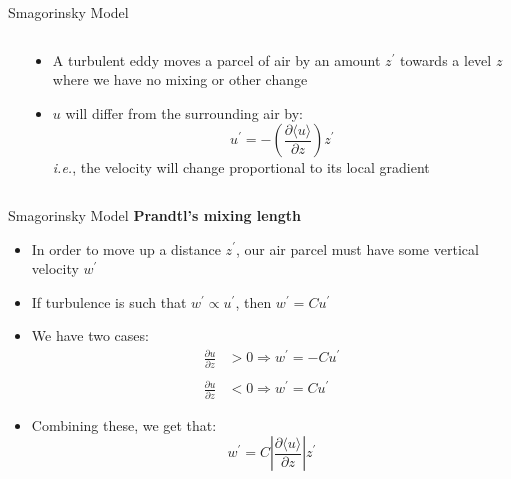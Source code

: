 \begin{frame}{Smagorinsky Model}
\begin{columns}[T]
\begin{column}{.26\textwidth}
\begin{minipage}[c][.5\textheight][c]{\linewidth}
    	\end{minipage}
    \end{column}
    \begin{column}{.74\textwidth}
    	\begin{itemize}
    		\item A turbulent eddy moves a parcel of air by an amount $z^\prime$ towards a level $z$ where we have no mixing or other change
    		\item $u$ will differ from the surrounding air by:
    		$$u^\prime = -\left(\frac{\partial \langle u\rangle}{\partial z}\right)z^\prime$$
    		\textit{i.e.}, the velocity will change proportional to its local gradient
    	\end{itemize}	
    \end{column}
  \end{columns}

\end{frame}

\begin{frame}{Smagorinsky Model}
\textbf{Prandtl's mixing length}

\begin{itemize}
	\item In order to move up a distance $z^\prime$, our air parcel must have some vertical velocity $w^\prime$
	\item If turbulence is such that $w^\prime \propto u^\prime$, then $w^\prime = Cu^\prime$
	\item We have two cases:
	\begin{align*}
	\frac{\partial u}{\partial z} &> 0 \Rightarrow w^\prime = -Cu^\prime\\\\
	\frac{\partial u}{\partial z} &< 0 \Rightarrow w^\prime = Cu^\prime	
	\end{align*}
	\item Combining these, we get that:
	$$w^\prime = C \left| \frac{\partial \langle u\rangle}{\partial z}\right|z^\prime$$
\end{itemize}

\end{frame}

